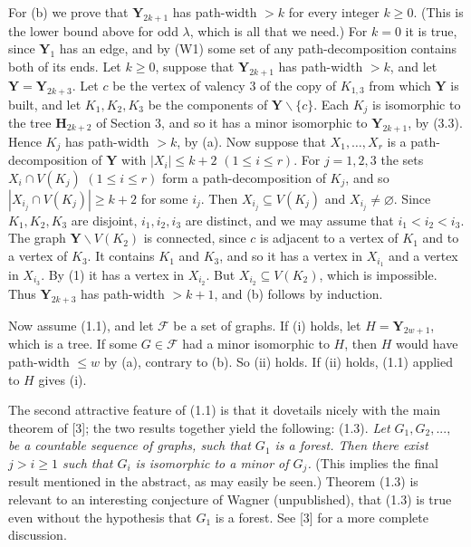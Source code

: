 {For (b) we prove that $\mathbf{Y}_{2k+1}$ has path-width $>k$ for every integer $k\ge 0$. (This is
the lower bound above for odd $\lambda$, which is all that we need.) For $k=0$ it is true, since
$\mathbf{Y}_1$ has an edge, and by (W1) some set of any path-decomposition contains both of its
ends. Let $k\ge 0$, suppose that $\mathbf{Y}_{2k+1}$ has path-width $>k$, and let
$\mathbf{Y}=\mathbf{Y}_{2k+3}$. Let $c$ be the vertex of valency 3 of the copy of $K_{1,3}$ from
which $\mathbf{Y}$ is built, and let $K_1, K_2, K_3$ be the components of $\mathbf{Y}\backslash\{c\}$.
Each $K_j$ is isomorphic to the tree $\mathbf{H}_{2k+2}$ of Section 3, and so it has a minor
isomorphic to $\mathbf{Y}_{2k+1}$, by (3.3). Hence $K_j$ has path-width $>k$, by (a). Now suppose
that $X_1,\dots,X_r$ is a path-decomposition of $\mathbf{Y}$ with $|X_i|\le k+2$ $(1\le i\le r)$. For
$j=1,2,3$ the sets $X_i\cap V(K_j)$ $(1\le i\le r)$ form a path-decomposition of $K_j$, and so
$|X_{i_j}\cap V(K_j)|\ge k+2$ for some $i_j$. Then $X_{i_j}\subseteq V(K_j)$ and
$X_{i_j}\ne\varnothing$. Since $K_1,K_2,K_3$ are disjoint, $i_1, i_2, i_3$ are distinct, and we may
assume that $i_1<i_2<i_3$. The graph $\mathbf{Y}\backslash V(K_2)$ is connected, since $c$ is
adjacent to a vertex of $K_1$ and to a vertex of $K_3$. It contains $K_1$ and $K_3$, and so it has
a vertex in $X_{i_1}$ and a vertex in $X_{i_3}$. By (1) it has a vertex in $X_{i_2}$. But
$X_{i_2}\subseteq V(K_2)$, which is impossible. Thus $\mathbf{Y}_{2k+3}$ has path-width $>k+1$, and
(b) follows by induction.

Now assume (1.1), and let $\mathscr{F}$ be a set of graphs. If (i) holds, let
$H=\mathbf{Y}_{2w+1}$, which is a tree. If some $G\in\mathscr{F}$ had a minor isomorphic to $H$,
then $H$ would have path-width $\le w$ by (a), contrary to (b). So (ii) holds. If (ii) holds, (1.1)
applied to $H$ gives (i).}

The second attractive feature of (1.1) is that it dovetails nicely with the
main theorem of [3]; the two results together yield the following:
\stmt
(1.3). \textit{Let $G_1, G_2,...,$ be a countable sequence of graphs, such that $G_1$ is a
forest. Then there exist $j>i\ge 1$ such that $G_i$ is isomorphic to a minor of $G_j$.}
\stmt
(This implies the final result mentioned in the abstract, as may easily be
seen.) Theorem (1.3) is relevant to an interesting conjecture of Wagner
(unpublished), that (1.3) is true even without the hypothesis that $G_1$ is a
forest. See [3] for a more complete discussion.


